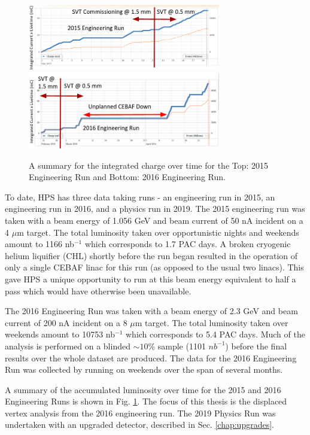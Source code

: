 \begin{figure}
    \centering
    \includegraphics[width=0.75\textwidth]{figs/detector/2015_data.png}
    \includegraphics[width=0.75\textwidth]{figs/detector/2016_data.png}
    \caption{A summary for the integrated charge over time for the Top: 2015 Engineering Run and Bottom: 2016 Engineering Run.}
    \label{fig:datasets}
\end{figure}

To date, HPS has three data taking runs - an engineering run in 2015, an engineering run in 2016, and a physics run in 2019. The 2015 engineering run was taken with a beam energy of 1.056 GeV and beam current of 50 nA incident on a 4 $\mu$m target. The total luminosity taken over opportunistic nights and weekends amount to 1166 nb$^{-1}$ which corresponds to 1.7 PAC days. A broken cryogenic helium liquifier (CHL) shortly before the run began resulted in the operation of only a single CEBAF linac for this run (as opposed to the usual two linacs). This gave HPS a unique opportunity to run at this beam energy equivalent to half a pass which would have otherwise been unavailable.

The 2016 Engineering Run was taken with a beam energy of 2.3 GeV and beam current of 200 nA incident on a 8 $\mu$m target. The total luminosity taken over weekends amount to 10753 nb$^{-1}$ which corresponds to 5.4 PAC days. Much of the analysis is performed on a blinded $\sim 10$\% sample (1101 $nb^{-1}$) before the final results over the whole dataset are produced. The data for the 2016 Engineering Run was collected by running on weekends over the span of several months.

A summary of the accumulated luminosity over time for the 2015 and 2016 Engineering Runs is shown in  Fig. \ref{fig:datasets}. The focus of this thesis is the displaced vertex analysis from the 2016 engineering run. The 2019 Physics Run was undertaken with an upgraded detector, described in Sec. \ref{chap:upgrades}.

